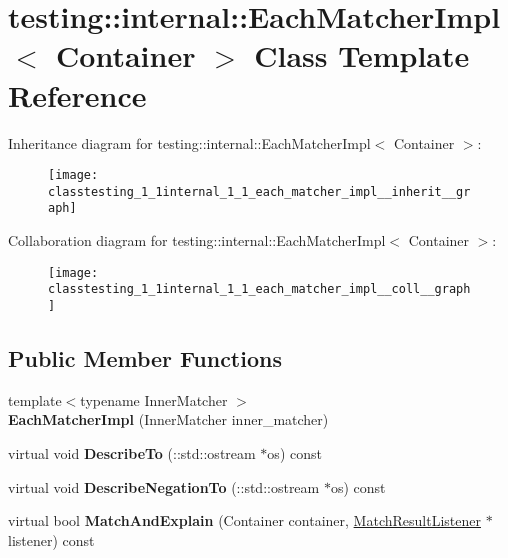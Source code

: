 \hypertarget{classtesting_1_1internal_1_1_each_matcher_impl}{}\section{testing\+:\+:internal\+:\+:Each\+Matcher\+Impl$<$ Container $>$ Class Template Reference}
\label{classtesting_1_1internal_1_1_each_matcher_impl}


Inheritance diagram for testing\+:\+:internal\+:\+:Each\+Matcher\+Impl$<$ Container $>$\+:
\nopagebreak
\begin{figure}[H]
\begin{center}
\leavevmode
\texttt{[image: classtesting\_1\_1internal\_1\_1\_each\_matcher\_impl\_\_inherit\_\_graph]}
\end{center}
\end{figure}


Collaboration diagram for testing\+:\+:internal\+:\+:Each\+Matcher\+Impl$<$ Container $>$\+:
\nopagebreak
\begin{figure}[H]
\begin{center}
\leavevmode
\texttt{[image: classtesting\_1\_1internal\_1\_1\_each\_matcher\_impl\_\_coll\_\_graph]}
\end{center}
\end{figure}
\subsection*{Public Member Functions}
\begin{DoxyCompactItemize}
\item 
\mbox{\label{classtesting_1_1internal_1_1_each_matcher_impl_afe41214bf055abcdd60e475f207c7a0f}} 
{\footnotesize template$<$typename Inner\+Matcher $>$ }\\{\bfseries Each\+Matcher\+Impl} (Inner\+Matcher inner\+\_\+matcher)
\item 
\mbox{\label{classtesting_1_1internal_1_1_each_matcher_impl_a605e1c800c74701a773205ec050cd574}} 
virtual void {\bfseries Describe\+To} (\+::std\+::ostream $\ast$os) const
\item 
\mbox{\label{classtesting_1_1internal_1_1_each_matcher_impl_a5be5bbd61f7a350fcbe30deea4c2a0c6}} 
virtual void {\bfseries Describe\+Negation\+To} (\+::std\+::ostream $\ast$os) const
\item 
\mbox{\label{classtesting_1_1internal_1_1_each_matcher_impl_a3b8ca89c85a96bbbcc74196ad29bf1ec}} 
virtual bool {\bfseries Match\+And\+Explain} (Container container, \mbox{\hyperlink{classtesting_1_1_match_result_listener}{Match\+Result\+Listener}} $\ast$listener) const
\end{DoxyCompactItemize}
